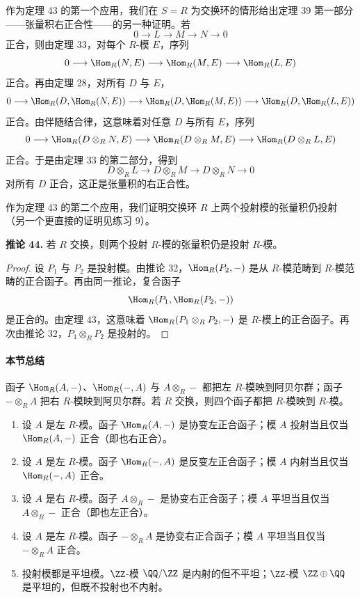 作为定理 43 的第一个应用，我们在 $S=R$ 为交换环的情形给出定理 39 第一部分——张量积右正合性——的另一种证明。若
\[
0\longrightarrow L\longrightarrow M\longrightarrow N\longrightarrow0
\]
正合，则由定理 33，对每个 $R$-模 $E$，序列
\[
0\longrightarrow\Hom_R(N,E)\longrightarrow\Hom_R(M,E)\longrightarrow\Hom_R(L,E)
\]
正合。再由定理 28，对所有 $D$ 与 $E$，
\[
0\longrightarrow\Hom_R(D,\Hom_R(N,E))\longrightarrow\Hom_R(D,\Hom_R(M,E))\longrightarrow\Hom_R(D,\Hom_R(L,E))
\]
正合。由伴随结合律，这意味着对任意 $D$ 与所有 $E$，序列
\[
0\longrightarrow\Hom_R(D\otimes_RN,E)\longrightarrow\Hom_R(D\otimes_RM,E)\longrightarrow\Hom_R(D\otimes_RL,E)
\]
正合。于是由定理 33 的第二部分，得到
\[
D\otimes_RL\longrightarrow D\otimes_RM\longrightarrow D\otimes_RN\longrightarrow0
\]
对所有 $D$ 正合，这正是张量积的右正合性。

作为定理 43 的第二个应用，我们证明交换环 $R$ 上两个投射模的张量积仍投射（另一个更直接的证明见练习 9）。

\noindent\textbf{推论 44.} 若 $R$ 交换，则两个投射 $R$-模的张量积仍是投射 $R$-模。

\begin{proof}
设 $P_1$ 与 $P_2$ 是投射模。由推论 32，$\Hom_R(P_2,-)$ 是从 $R$-模范畴到 $R$-模范畴的正合函子。再由同一推论，复合函子
\[
\Hom_R(P_1,\Hom_R(P_2,-))
\]
是正合的。由定理 43，这意味着 $\Hom_R(P_1\otimes_RP_2,-)$ 是 $R$-模上的正合函子。再次由推论 32，$P_1\otimes_RP_2$ 是投射的。
\end{proof}

\paragraph{本节总结}
函子 $\Hom_R(A,-)$、$\Hom_R(-,A)$ 与 $A\otimes_R-$ 都把左 $R$-模映到阿贝尔群；函子 $-\otimes_RA$ 把右 $R$-模映到阿贝尔群。若 $R$ 交换，则四个函子都把 $R$-模映到 $R$-模。
\begin{enumerate}[label=(\arabic*)]
\item 设 $A$ 是左 $R$-模。函子 $\Hom_R(A,-)$ 是协变左正合函子；模 $A$ 投射当且仅当 $\Hom_R(A,-)$ 正合（即也右正合）。
\item 设 $A$ 是左 $R$-模。函子 $\Hom_R(-,A)$ 是反变左正合函子；模 $A$ 内射当且仅当 $\Hom_R(-,A)$ 正合。
\item 设 $A$ 是右 $R$-模。函子 $A\otimes_R-$ 是协变右正合函子；模 $A$ 平坦当且仅当 $A\otimes_R-$ 正合（即也左正合）。
\item 设 $A$ 是左 $R$-模。函子 $-\otimes_RA$ 是协变右正合函子；模 $A$ 平坦当且仅当 $-\otimes_RA$ 正合。
\item 投射模都是平坦模。$\ZZ$-模 $\QQ/\ZZ$ 是内射的但不平坦；$\ZZ$-模 $\ZZ\oplus\QQ$ 是平坦的，但既不投射也不内射。
\end{enumerate}



